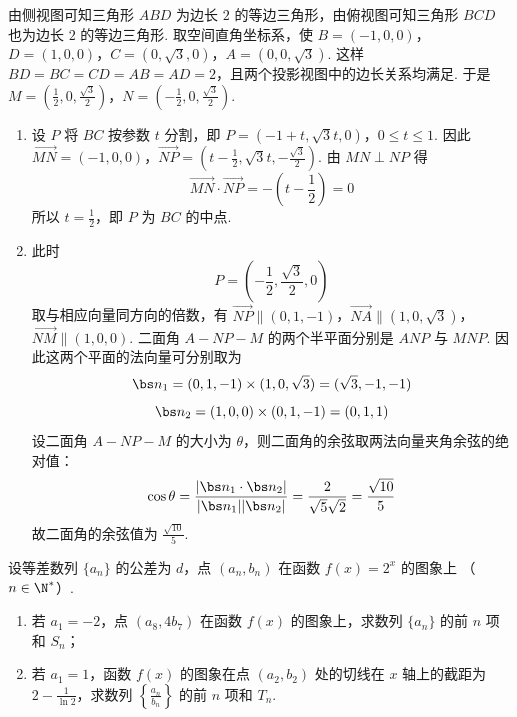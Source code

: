 \begin{solution}
由侧视图可知三角形 \(ABD\) 为边长 \(2\) 的等边三角形，由俯视图可知三角形 \(BCD\) 也为边长 \(2\) 的等边三角形. 取空间直角坐标系，使
\(B=(-1,0,0)\)，\(D=(1,0,0)\)，\(C=(0,\sqrt3,0)\)，\(A=(0,0,\sqrt3)\).
这样 \(BD=BC=CD=AB=AD=2\)，且两个投影视图中的边长关系均满足. 于是
\(M=\left(\frac12,0,\frac{\sqrt3}{2}\right)\)，\(N=\left(-\frac12,0,\frac{\sqrt3}{2}\right)\).

\begin{enumerate}
\item
设 \(P\) 将 \(BC\) 按参数 \(t\) 分割，即
\(P=(-1+t,\sqrt3t,0)\)，\(0\leqslant t\leqslant1\).
因此
\(\overrightarrow{MN} =(-1,0,0)\)，\(\overrightarrow{NP}=\left(t-\frac12,\sqrt3t,-\frac{\sqrt3}{2}\right)\).
由 \(MN\perp NP\) 得
\[
\overrightarrow{MN}\cdot\overrightarrow{NP}
=-\left(t-\frac12\right)=0
\]
所以 \(t=\frac12\)，即 \(P\) 为 \(BC\) 的中点.

\item
此时
\[
P=\left(-\frac12,\frac{\sqrt3}{2},0\right)
\]
取与相应向量同方向的倍数，有
\(\overrightarrow{NP}\parallel(0,1,-1)\)，\(\overrightarrow{NA}\parallel(1,0,\sqrt3)\)，\(\overrightarrow{NM}\parallel(1,0,0)\).
二面角 \(A-NP-M\) 的两个半平面分别是 \(ANP\) 与 \(MNP\). 因此这两个平面的法向量可分别取为
\[
\bs n_1=(0,1,-1)\times(1,0,\sqrt3)=(\sqrt3,-1,-1)
\]
\[
\bs n_2=(1,0,0)\times(0,1,-1)=(0,1,1)
\]
设二面角 \(A-NP-M\) 的大小为 \(\theta\)，则二面角的余弦取两法向量夹角余弦的绝对值：
\[
\cos\theta=\frac{|\bs n_1\cdot\bs n_2|}{|\bs n_1||\bs n_2|}
=\frac{2}{\sqrt5\sqrt2}=\frac{\sqrt{10}}5
\]
故二面角的余弦值为 \(\frac{\sqrt{10}}5\).
\end{enumerate}
\end{solution}

\begin{problem}
设等差数列 \(\{a_{n}\}\) 的公差为 \(d\)，点 \((a_{n}, b_{n})\) 在函数 \(f(x) = 2^{x}\) 的图象上 （\(n \in \N^{*}\)）.
\begin{enumerate}
\item 若 \(a_{1} = -2\)，点 \((a_{8}, 4b_{7})\) 在函数 \(f(x)\) 的图象上，求数列 \(\{a_{n}\}\) 的前 \(n\) 项和 \(S_{n}\)；
\item 若 \(a_{1} = 1\)，函数 \(f(x)\) 的图象在点 \((a_{2}, b_{2})\) 处的切线在 \(x\) 轴上的截距为 \(2 - \frac{1}{\ln 2}\)，求数列 \(\left\{\frac{a_n}{b_n}\right\}\) 的前 \(n\) 项和 \(T_{n}\).
\end{enumerate}
\end{problem}

